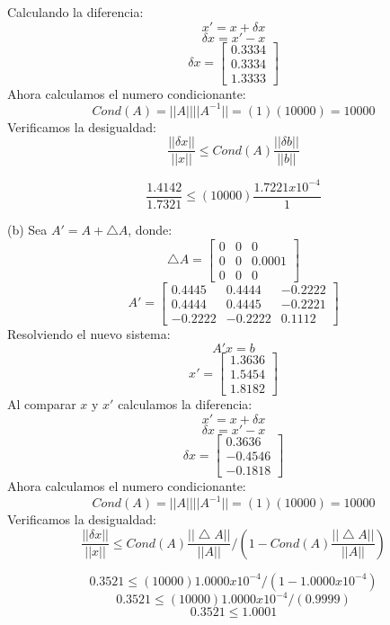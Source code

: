 \documentclass[12pt]{article}
\begin{document}
Calculando la diferencia:
$$x'=  x+\delta x $$
$$\delta x = x'-x$$
$$\delta x=\begin{bmatrix}
    0.3334\\
   0.3334\\
   1.3333
\end{bmatrix}$$
Ahora calculamos el numero condicionante:
$$Cond(A)=||A||||A^{-1}||= (1)(10000)=10000$$
Verificamos la desigualdad:
$$\frac{||\delta x||}{||x||} \leq Cond(A)\frac{||\delta b||}{||b||}$$

$$\frac{1.4142}{1.7321} \leq (10000)\frac{1.7221 x 10^{-4}}{1}$$


(b) Sea $A'=A+\bigtriangleup A$, donde:
$$\bigtriangleup A=\begin{bmatrix}
    0 & 0 & 0\\
    0& 0 & 0.0001\\
    0&0&0
\end{bmatrix}
$$
$$A'=\begin{bmatrix}
     0.4445&0.4444&-0.2222\\
    0.4444&0.4445&-0.2221\\
    -0.2222&-0.2222&0.1112
\end{bmatrix}
$$
Resolviendo el nuevo sistema:
$$A'x=b$$
$$x'=\begin{bmatrix}
    1.3636\\
    1.5454\\
    1.8182
\end{bmatrix}
$$
Al comparar $x$ y $x'$ calculamos la diferencia:
$$x'=  x+\delta x $$
$$\delta x = x'-x$$
$$\delta x=\begin{bmatrix}
    0.3636\\
  -0.4546\\
   -0.1818
\end{bmatrix}$$
Ahora calculamos el numero condicionante:
$$Cond(A)=||A||||A^{-1}||= (1)(10000)=10000$$
Verificamos la desigualdad:
$$\frac{||\delta x||}{||x||} \leq Cond(A)\frac{||\bigtriangleup A||}{||A||}/(1-Cond(A)\frac{||\bigtriangleup A||}{||A||})$$

$$0.3521 \leq (10000)1.0000 x 10^{-4}/(1-1.0000 x 10^{-4})$$
$$0.3521 \leq (10000)1.0000 x 10^{-4}/(0.9999)$$
$$0.3521 \leq 1.0001$$
\end{document}
